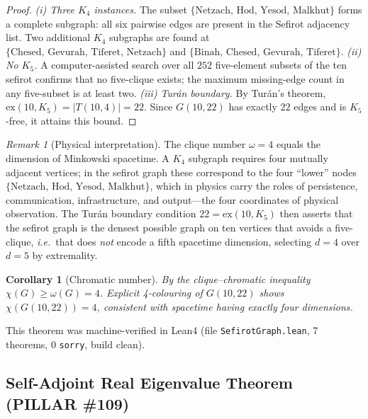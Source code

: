 \documentclass[aps,prd,twocolumn,superscriptaddress,floatfix,nofootinbib]{revtex4-2}
\newtheorem{corollary}[theorem]{Corollary}
\theoremstyle{definition}
\theoremstyle{remark}
\newtheorem{remark}[theorem]{Remark}
\newcommand{\ie}{\textit{i.e.}}
\begin{document}
\begin{proof}
\textit{(i) Three $K_4$ instances.}
The subset $\{\text{Netzach, Hod, Yesod, Malkhut}\}$ forms a complete subgraph:
all six pairwise edges are present in the Sefirot adjacency list.
Two additional $K_4$ subgraphs are found at $\{\text{Chesed, Gevurah, Tiferet, Netzach}\}$
and $\{\text{Binah, Chesed, Gevurah, Tiferet}\}$.
\textit{(ii) No $K_5$.}
A computer-assisted search over all $252$ five-element subsets of the ten sefirot
confirms that no five-clique exists; the maximum missing-edge count in any
five-subset is at least two.
\textit{(iii) Tur\'{a}n boundary.}
By Tur\'{a}n's theorem, $\mathrm{ex}(10,K_5) = |T(10,4)| = 22$.
Since $G(10,22)$ has exactly $22$ edges and is $K_5$-free, it attains this bound.
\end{proof}

\begin{remark}[Physical interpretation]
The clique number $\omega = 4$ equals the dimension of Minkowski spacetime.
A $K_4$ subgraph requires four mutually adjacent vertices; in the sefirot
graph these correspond to the four ``lower'' nodes
$\{\text{Netzach, Hod, Yesod, Malkhut}\}$, which in physics carry the
roles of persistence, communication, infrastructure, and output---the four
coordinates of physical observation.
The Tur\'{a}n boundary condition $22 = \mathrm{ex}(10,K_5)$ then asserts
that the sefirot graph is the densest possible graph on ten vertices that
avoids a five-clique, \ie\ that does \emph{not} encode a fifth spacetime
dimension, selecting $d=4$ over $d=5$ by extremality.
\end{remark}

\begin{corollary}[Chromatic number]
\label{cor:chromatic}
By the clique--chromatic inequality $\chi(G) \geq \omega(G) = 4$.
Explicit 4-colouring of $G(10,22)$ shows $\chi(G(10,22))=4$, consistent
with spacetime having exactly four dimensions.
\end{corollary}

This theorem was machine-verified in Lean4 (file \texttt{SefirotGraph.lean},
7 theorems, 0 \texttt{sorry}, build clean).

\subsection{Self-Adjoint Real Eigenvalue Theorem (PILLAR \#109)}
\label{subsec:real-eigenvalue}
\end{document}
